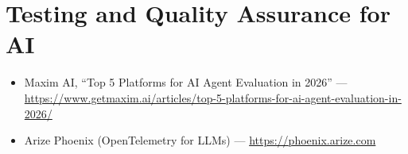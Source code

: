 \section{Testing and Quality Assurance for AI}

\begin{itemize}
  \item Maxim AI, ``Top 5 Platforms for AI Agent Evaluation in 2026'' --- \\
    \url{https://www.getmaxim.ai/articles/top-5-platforms-for-ai-agent-evaluation-in-2026/}
  \item Arize Phoenix (OpenTelemetry for LLMs) --- \url{https://phoenix.arize.com}
\end{itemize}
